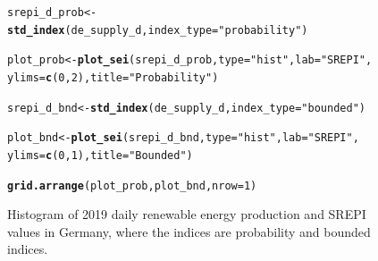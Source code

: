 \documentclass[article,shortnames,nojss]{jss}\usepackage[]{graphicx}\usepackage[]{xcolor}
\makeatletter
\newcommand{\hlnum}[1]{\textcolor[rgb]{0.686,0.059,0.569}{#1}}%
\newcommand{\hlstr}[1]{\textcolor[rgb]{0.192,0.494,0.8}{#1}}%
\newcommand{\hlstd}[1]{\textcolor[rgb]{0.345,0.345,0.345}{#1}}%
\newcommand{\hlkwb}[1]{\textcolor[rgb]{0.69,0.353,0.396}{#1}}%
\newcommand{\hlkwc}[1]{\textcolor[rgb]{0.333,0.667,0.333}{#1}}%
\newcommand{\hlkwd}[1]{\textcolor[rgb]{0.737,0.353,0.396}{\textbf{#1}}}%
\newenvironment{kframe}{%
 \def\at@end@of@kframe{}%
 \ifinner\ifhmode%
  \def\at@end@of@kframe{\end{minipage}}%
  \begin{minipage}{\columnwidth}%
 \fi\fi%
 \def\FrameCommand##1{\hskip\@totalleftmargin \hskip-\fboxsep
 \colorbox{shadecolor}{##1}\hskip-\fboxsep
     \hskip-\linewidth \hskip-\@totalleftmargin \hskip\columnwidth}%
 \MakeFramed {\advance\hsize-\width
   \@totalleftmargin\z@ \linewidth\hsize
   \@setminipage}}%
 {\par\unskip\endMakeFramed%
 \at@end@of@kframe}
\newenvironment{knitrout}{}{} %
\makeatother
\begin{document}
\begin{figure}
\begin{knitrout}
\color{fgcolor}\begin{kframe}
\begin{alltt}
\hlstd{srepi_d_prob} \hlkwb{<-} \hlkwd{std_index}\hlstd{(de_supply_d,} \hlkwc{index_type} \hlstd{=} \hlstr{"probability"}\hlstd{)}
\end{alltt}


{\ttfamily\noindent\bfseries\color{errorcolor}{\#\# Error in check\_inputs(inputs): index\_type must be one of 'normal', 'prob01', or 'prob11'}}\begin{alltt}
\hlstd{plot_prob} \hlkwb{<-} \hlkwd{plot_sei}\hlstd{(srepi_d_prob,} \hlkwc{type} \hlstd{=} \hlstr{"hist"}\hlstd{,} \hlkwc{lab} \hlstd{=} \hlstr{"SREPI"}\hlstd{,}
                      \hlkwc{ylims} \hlstd{=} \hlkwd{c}\hlstd{(}\hlnum{0}\hlstd{,} \hlnum{2}\hlstd{),} \hlkwc{title} \hlstd{=} \hlstr{"Probability"}\hlstd{)}
\end{alltt}


{\ttfamily\noindent\bfseries\color{errorcolor}{\#\# Error in eval(expr, envir, enclos): object 'srepi\_d\_prob' not found}}\begin{alltt}
\hlstd{srepi_d_bnd} \hlkwb{<-} \hlkwd{std_index}\hlstd{(de_supply_d,} \hlkwc{index_type} \hlstd{=} \hlstr{"bounded"}\hlstd{)}
\end{alltt}


{\ttfamily\noindent\bfseries\color{errorcolor}{\#\# Error in check\_inputs(inputs): index\_type must be one of 'normal', 'prob01', or 'prob11'}}\begin{alltt}
\hlstd{plot_bnd} \hlkwb{<-} \hlkwd{plot_sei}\hlstd{(srepi_d_bnd,} \hlkwc{type} \hlstd{=} \hlstr{"hist"}\hlstd{,} \hlkwc{lab} \hlstd{=} \hlstr{"SREPI"}\hlstd{,}
                     \hlkwc{ylims} \hlstd{=} \hlkwd{c}\hlstd{(}\hlnum{0}\hlstd{,} \hlnum{1}\hlstd{),} \hlkwc{title} \hlstd{=} \hlstr{"Bounded"}\hlstd{)}
\end{alltt}


{\ttfamily\noindent\bfseries\color{errorcolor}{\#\# Error in eval(expr, envir, enclos): object 'srepi\_d\_bnd' not found}}\begin{alltt}
\hlkwd{grid.arrange}\hlstd{(plot_prob, plot_bnd,} \hlkwc{nrow} \hlstd{=} \hlnum{1}\hlstd{)}
\end{alltt}


{\ttfamily\noindent\bfseries\color{errorcolor}{\#\# Error in eval(expr, envir, enclos): object 'plot\_prob' not found}}\end{kframe}
\end{knitrout}
\caption{Histogram of 2019 daily renewable energy production and SREPI values in Germany, where the indices are probability and bounded indices.}
\label{fig:dist_raw_unif}
\end{figure}
\end{document}
